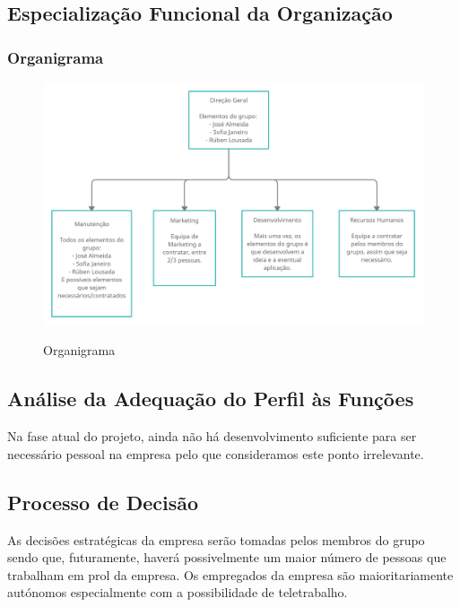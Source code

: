 \documentclass[11pt]{article}
\begin{document}
	\large
	\subsection{Especialização Funcional da Organização}
	\subsubsection{Organigrama}
	
	\normalsize
	
	\begin{figure}[h]
		\includegraphics[width=1\textwidth,keepaspectratio]{organigrama}
		\label{fig:organigrama}
		\centering
		\caption{Organigrama}
	\end{figure}
	
	
	\large
	\subsection{Análise da Adequação do Perfil às Funções}
	
	\normalsize
	
	Na fase atual do projeto, ainda não há desenvolvimento suficiente para ser necessário
	pessoal na empresa pelo que consideramos este ponto irrelevante.
	
	
	\large
	\subsection{Processo de Decisão}
	
	\normalsize
	
	As decisões estratégicas da empresa serão tomadas pelos membros do grupo sendo que, futuramente, haverá possivelmente um maior número de pessoas que trabalham em prol da empresa. Os empregados da empresa são maioritariamente autónomos especialmente com a possibilidade de teletrabalho. 
	
\end{document}
